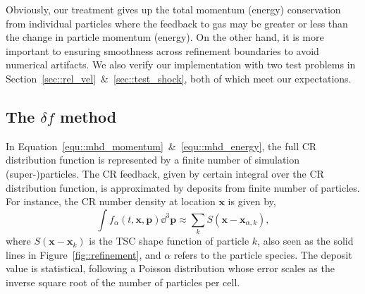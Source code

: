 \documentclass[fleqn,usenatbib]{mnras}
\begin{document}
Obviously, our treatment gives up the total momentum (energy) conservation from individual particles where the feedback to gas may be greater or less than the change in particle momentum (energy). On the other hand, it is more important to ensuring smoothness across refinement boundaries to avoid numerical artifacts.
We also verify our implementation with two test problems in Section~\ref{sec::rel_vel}~\&~\ref{sec::test_shock}, both of which meet our expectations.

\subsection{The $\delta f$ method}\label{ssec:deltaf}
In Equation~\ref{equ::mhd_momentum}~\&~\ref{equ::mhd_energy}, the full CR distribution function is represented by a finite number of simulation (super-)particles. The CR feedback, given by certain integral over the CR distribution function, is approximated by deposits from finite number of particles. For instance, the CR number density at location $\boldsymbol{x}$ is given by,
\begin{equation*}
    \int f_\alpha \left(t, \boldsymbol{x}, \boldsymbol{p}\right) \dd^3 \boldsymbol{p} \approx  \sum_{k} S\left(\boldsymbol{x} - \boldsymbol{x}_{\alpha, k} \right),
\end{equation*}
where $S\left(\boldsymbol{x} - \boldsymbol{x}_k \right)$ is the TSC shape function of particle $k$, also seen as the solid lines in Figure~\ref{fig::refinement}, and $\alpha$ refers to the particle species. The deposit value is statistical, following a Poisson distribution whose error scales as the inverse square root of the number of particles per cell.
\end{document}
